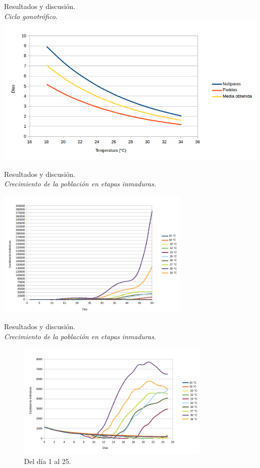 \begin{frame}[t]{Resultados y discusión.\\\textit{Ciclo gonotrófico.}}
    \includegraphics[width=\textwidth]{./graphics/ciclo-gonotrofico-temperatura.png}
\end{frame}


\begin{frame}[t]{Resultados y discusión.\\\textit{Crecimiento de la población en etapas inmaduras.}}
\begin{center}
    \includegraphics[width=9.3cm]{../paper/graphics/evolucion-poblacion-all.png}
\end{center}
\end{frame}

\begin{frame}[t]{Resultados y discusión.\\\textit{Crecimiento de la población en etapas inmaduras.}}
\begin{center}
\begin{figure}
     \includegraphics[width=9.3cm]{./graphics/poblacion-inmadura-p1.png}
     \caption{Del día 1 al 25.}
\end{figure}
\end{center}
\end{frame}

